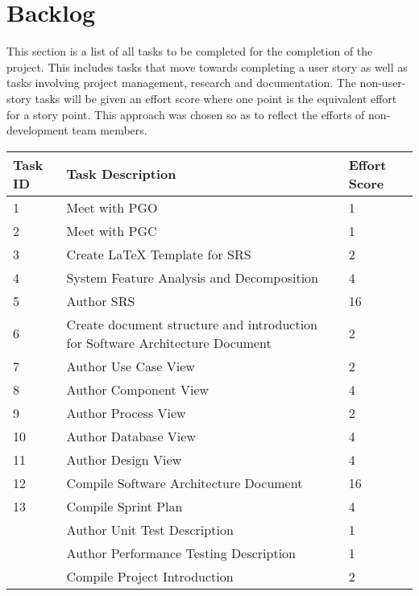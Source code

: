 \documentclass[11pt]{article}
\begin{document}
\section{Backlog}
This section is a list of all tasks to be completed for the completion of the project. This includes tasks that move towards completing a user story as well as tasks involving project management, research and documentation. The non-user-story tasks will be given an effort score where one point is the equivalent effort for a story point. This approach was chosen so as to reflect the efforts of non-development team members.
\begin{table}[H]
	\begin{tabular}{@{}|l|l|l|@{}}
		\toprule
		Task ID & Task Description & Effort Score \\ \midrule
1		& Meet with PGO          & 1    \\ \midrule
2		& Meet with PGC & 1       \\ \midrule
3		& Create LaTeX Template for SRS& 2               \\ \midrule
4		& System Feature Analysis and Decomposition                 & 4               \\ \midrule
5		& Author SRS                 & 16               \\ \midrule
6		& Create document structure and introduction for Software Architecture Document & 2               \\ \midrule
7		& Author Use Case View                & 2             \\ \midrule
8		& Author Component View&               4\\ \midrule
9		& Author Process View&             2  \\ \midrule
10		& Author Database View &            4   \\ \midrule
11		& Author Design View&              4 \\ \midrule
12		& Compile Software Architecture Document& 16              \\ \midrule
13		& Compile Sprint Plan & 4             \\ \midrule
				&Author Unit Test Description          &1     \\ \midrule
				&Author Performance Testing Description           &1     \\ \midrule
		& Compile Project Introduction                 & 2   \\ \bottomrule
	\end{tabular}
\end{table}
\end{document}
